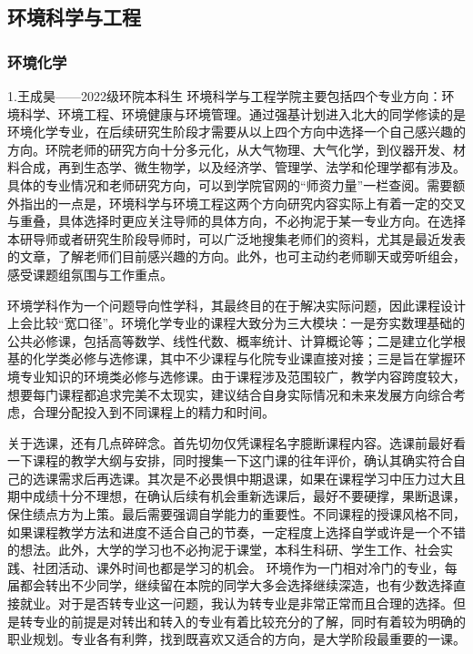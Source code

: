 \documentclass[11pt,oneside]{book}
\begin{document}
\subsection{环境科学与工程}

\subsubsection{环境化学}

1.王成昊——2022级环院本科生
环境科学与工程学院主要包括四个专业方向：环境科学、环境工程、环境健康与环境管理。通过强基计划进入北大的同学修读的是环境化学专业，在后续研究生阶段才需要从以上四个方向中选择一个自己感兴趣的方向。环院老师的研究方向十分多元化，从大气物理、大气化学，到仪器开发、材料合成，再到生态学、微生物学，以及经济学、管理学、法学和伦理学都有涉及。具体的专业情况和老师研究方向，可以到学院官网的“师资力量”一栏查阅。需要额外指出的一点是，环境科学与环境工程这两个方向研究内容实际上有着一定的交叉与重叠，具体选择时更应关注导师的具体方向，不必拘泥于某一专业方向。在选择本研导师或者研究生阶段导师时，可以广泛地搜集老师们的资料，尤其是最近发表的文章，了解老师们目前感兴趣的方向。此外，也可主动约老师聊天或旁听组会，感受课题组氛围与工作重点。

环境学科作为一个问题导向性学科，其最终目的在于解决实际问题，因此课程设计上会比较“宽口径”。环境化学专业的课程大致分为三大模块：一是夯实数理基础的公共必修课，包括高等数学、线性代数、概率统计、计算概论等；二是建立化学根基的化学类必修与选修课，其中不少课程与化院专业课直接对接；三是旨在掌握环境专业知识的环境类必修与选修课。由于课程涉及范围较广，教学内容跨度较大，想要每门课程都追求完美不太现实，建议结合自身实际情况和未来发展方向综合考虑，合理分配投入到不同课程上的精力和时间。

关于选课，还有几点碎碎念。首先切勿仅凭课程名字臆断课程内容。选课前最好看一下课程的教学大纲与安排，同时搜集一下这门课的往年评价，确认其确实符合自己的选课需求后再选课。其次是不必畏惧中期退课，如果在课程学习中压力过大且期中成绩十分不理想，在确认后续有机会重新选课后，最好不要硬撑，果断退课，保住绩点方为上策。最后需要强调自学能力的重要性。不同课程的授课风格不同，如果课程教学方法和进度不适合自己的节奏，一定程度上选择自学或许是一个不错的想法。此外，大学的学习也不必拘泥于课堂，本科生科研、学生工作、社会实践、社团活动、课外时间也都是学习的机会。
环境作为一门相对冷门的专业，每届都会转出不少同学，继续留在本院的同学大多会选择继续深造，也有少数选择直接就业。对于是否转专业这一问题，我认为转专业是非常正常而且合理的选择。但是转专业的前提是对转出和转入的专业有着比较充分的了解，同时有着较为明确的职业规划。专业各有利弊，找到既喜欢又适合的方向，是大学阶段最重要的一课。
\end{document}
